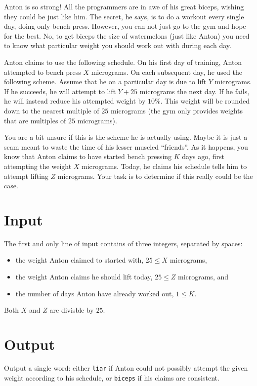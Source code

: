 Anton is so strong!
All the programmers are in awe of his great biceps, wishing they could be just like him.
The secret, he says, is to do a workout every single day, doing only bench press.
However, you can not just go to the gym and hope for the best.
No, to get biceps the size of watermelons (just like Anton) you need to know what particular weight you should work out with during each day.

Anton claims to use the following schedule.
On his first day of training, Anton attempted to bench press $X$ micrograms.
On each subsequent day, he used the following scheme.
Assume that he on a particular day is due to lift $Y$ micrograms.
If he succeeds, he will attempt to lift $Y + 25$ micrograms the next day.
If he fails, he will instead reduce his attempted weight by $10\%$.
This weight will be rounded down to the nearest multiple of $25$ micrograms (the gym only provides weights that are multiples of $25$ micrograms).

You are a bit unsure if this is the scheme he is actually using.
Maybe it is just a scam meant to waste the time of his lesser muscled ``friends''.
As it happens, you know that Anton claims to have started bench pressing $K$ days ago, first attempting the weight $X$ micrograms.
Today, he claims his schedule tells him to attempt lifting $Z$ micrograms.
Your task is to determine if this really could be the case.

\section*{Input}
The first and only line of input contains of three integers, separated by spaces:
\begin{itemize}
\item the weight Anton claimed to started with, $25 \le X$ micrograms,
\item the weight Anton claims he should lift today, $25 \le Z$ micrograms, and
\item the number of days Anton have already worked out, $1 \le K$.
\end{itemize}

Both $X$ and $Z$ are divisble by $25$.

\section*{Output}
Output a single word: either \texttt{liar} if Anton could not possibly attempt the given weight according to his schedule, or \texttt{biceps} if his claims are consistent.

